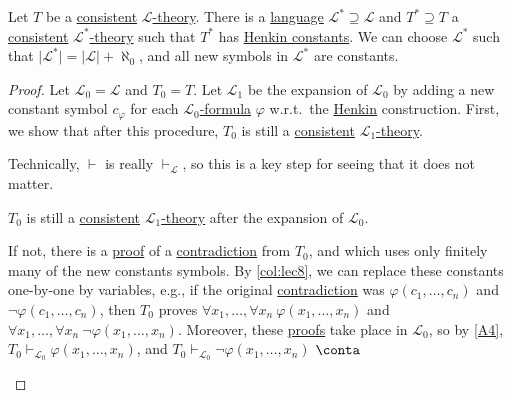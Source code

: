 \begin{theorem}\label{thm:lec8}
	Let \(T\) be a \hyperref[def:consistent]{consistent} \hyperref[def:theory]{\(\mathcal{L} \)-theory}. There is a \hyperref[def:language]{language} \(\mathcal{L} ^{\ast} \supseteq \mathcal{L}\) and \(T^{\ast} \supseteq T\) a \hyperref[def:consistent]{consistent} \hyperref[def:theory]{\(\mathcal{L} ^{\ast} \)-theory} such that \(T^{\ast} \) has \hyperref[def:Henkin-constant]{Henkin constants}. We can choose \(\mathcal{L} ^{\ast} \) such that \(\vert \mathcal{L} ^{\ast} \vert = \vert \mathcal{L} \vert + \aleph _0\), and all new symbols in \(\mathcal{L} ^{\ast} \) are constants.
\end{theorem}
\begin{proof}
	Let \(\mathcal{L} _0 = \mathcal{L} \) and \(T_0 = T\). Let \(\mathcal{L} _1\) be the expansion of \(\mathcal{L} _0\) by adding a new constant symbol \(c_{\varphi} \) for each \hyperref[def:formula]{\(\mathcal{L} _0\)-formula} \(\varphi\) w.r.t.\ the \hyperref[def:Henkin-constant]{Henkin} construction. First, we show that after this procedure, \(T_0\) is still a \hyperref[def:consistent]{consistent} \hyperref[def:theory]{\(\mathcal{L} _1\)-theory}.

	\begin{remark}
		Technically, \(\vdash \) is really \(\vdash _{\mathcal{L} }\), so this is a key step for seeing that it does not matter.
	\end{remark}

	\begin{claim}
		\(T_0\) is still a \hyperref[def:consistent]{consistent} \hyperref[def:theory]{\(\mathcal{L} _1\)-theory} after the expansion of \(\mathcal{L} _0\).
	\end{claim}
	\begin{explanation}
		If not, there is a \hyperref[def:proof]{proof} of a \hyperref[prop:proof-by-contradiction]{contradiction} from \(T_0\), and which uses only finitely many of the new constants symbols. By \autoref{col:lec8}, we can replace these constants one-by-one by variables, e.g., if the original \hyperref[prop:proof-by-contradiction]{contradiction} was \(\varphi (c_1, \ldots , c_n)\) and \(\lnot \varphi (c_1, \ldots , c_n)\), then \(T_0\) proves \(\forall x_1, \ldots , \forall x_n\ \varphi (x_1, \ldots , x_n)\) and \(\forall x_1, \ldots , \forall x_n\ \lnot \varphi (x_1, \ldots , x_n)\). Moreover, these \hyperref[def:proof]{proofs} take place in \(\mathcal{L} _0\), so by \autoref{A4}, \(T_0 \vdash _{\mathcal{L} _0} \varphi (x_1, \ldots , x_n)\), and \(T_0 \vdash _{\mathcal{L} _0} \lnot \varphi (x_1, \ldots , x_n)\) \(\conta\)
	\end{explanation}


\end{proof}

